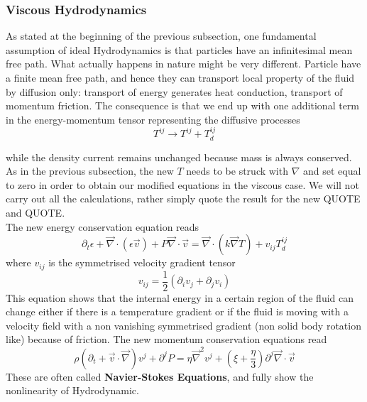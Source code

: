 \documentclass[11pt]{article}
\begin{document}
\subsubsection{Viscous Hydrodynamics}

As stated at the beginning of the previous subsection, one fundamental assumption of ideal Hydrodynamics is that particles have an infinitesimal mean free path. What actually happens in nature might be very different. Particle have a finite mean free path, and hence they can transport local property of the fluid by diffusion only: transport of energy generates heat conduction, transport of momentum friction. The consequence is that we end up with one additional term in the energy-momentum tensor representing the diffusive processes
$$
T^{ij} \to T^{ij} + T^{ij}_d 
$$

while the density current remains unchanged because mass is always conserved. As in the previous subsection, the new $T$ needs to be struck with $\nabla$ and set equal to zero in order to obtain our modified equations in the viscous case. We will not carry out all the calculations, rather simply quote the result for the new QUOTE and QUOTE. \\
The new energy conservation equation reads
$$
\partial_t \epsilon + \vec \nabla \cdot (\epsilon \vec{v}) + P \vec \nabla \cdot \vec{v} = \vec \nabla \cdot (k \vec \nabla T) + v_{ij} T_d^{ij} 
$$
where $v_{ij}$ is the symmetrised velocity gradient tensor
$$
v_{ij} = \frac{1}{2}(\partial_i v_j + \partial_j v_i)
$$
This equation shows that the internal energy in a certain region of the fluid can change either if there is a temperature gradient or if the fluid is moving with a velocity field with a non vanishing symmetrised gradient (non solid body rotation like) because of friction.
The new momentum conservation equations read
$$
\rho \left( \partial_t + \vec{v} \cdot \vec \nabla \right) v^j+\partial^jP = \eta \vec \nabla^2v^j + \left( \xi + \frac{\eta}{3} \right) \partial^j \vec \nabla \cdot \vec{v}
$$
These are often called \textbf{Navier-Stokes Equations}, and fully show the nonlinearity of Hydrodynamic.
\end{document}
